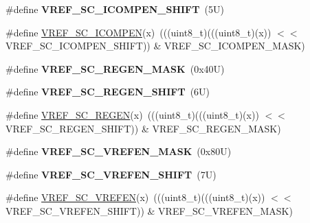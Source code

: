 \begin{DoxyCompactItemize}
\item 
\mbox{\label{group___v_r_e_f___register___masks_gab4b6bb1062b8e67c9224814d85df2a2c}} 
\#define {\bfseries V\+R\+E\+F\+\_\+\+S\+C\+\_\+\+I\+C\+O\+M\+P\+E\+N\+\_\+\+S\+H\+I\+FT}~(5\+U)
\item 
\#define \mbox{\hyperlink{group___v_r_e_f___register___masks_gab383d7f445ab9bf9266da50107d30f7f}{V\+R\+E\+F\+\_\+\+S\+C\+\_\+\+I\+C\+O\+M\+P\+EN}}(x)~(((uint8\+\_\+t)(((uint8\+\_\+t)(x)) $<$$<$ V\+R\+E\+F\+\_\+\+S\+C\+\_\+\+I\+C\+O\+M\+P\+E\+N\+\_\+\+S\+H\+I\+FT)) \& V\+R\+E\+F\+\_\+\+S\+C\+\_\+\+I\+C\+O\+M\+P\+E\+N\+\_\+\+M\+A\+SK)
\item 
\mbox{\label{group___v_r_e_f___register___masks_ga1396c56eb73d89394a57b1f83f20c9ea}} 
\#define {\bfseries V\+R\+E\+F\+\_\+\+S\+C\+\_\+\+R\+E\+G\+E\+N\+\_\+\+M\+A\+SK}~(0x40\+U)
\item 
\mbox{\label{group___v_r_e_f___register___masks_gacfe64ba6f4a76a4aef274f2fedb95a90}} 
\#define {\bfseries V\+R\+E\+F\+\_\+\+S\+C\+\_\+\+R\+E\+G\+E\+N\+\_\+\+S\+H\+I\+FT}~(6\+U)
\item 
\#define \mbox{\hyperlink{group___v_r_e_f___register___masks_gac93682ccff6c6c12d1929940d197020a}{V\+R\+E\+F\+\_\+\+S\+C\+\_\+\+R\+E\+G\+EN}}(x)~(((uint8\+\_\+t)(((uint8\+\_\+t)(x)) $<$$<$ V\+R\+E\+F\+\_\+\+S\+C\+\_\+\+R\+E\+G\+E\+N\+\_\+\+S\+H\+I\+FT)) \& V\+R\+E\+F\+\_\+\+S\+C\+\_\+\+R\+E\+G\+E\+N\+\_\+\+M\+A\+SK)
\item 
\mbox{\label{group___v_r_e_f___register___masks_ga2df8186aa60a77e25e67589bc50ce539}} 
\#define {\bfseries V\+R\+E\+F\+\_\+\+S\+C\+\_\+\+V\+R\+E\+F\+E\+N\+\_\+\+M\+A\+SK}~(0x80\+U)
\item 
\mbox{\label{group___v_r_e_f___register___masks_gaca5e397ea8b43f55854f4a6b80ec479b}} 
\#define {\bfseries V\+R\+E\+F\+\_\+\+S\+C\+\_\+\+V\+R\+E\+F\+E\+N\+\_\+\+S\+H\+I\+FT}~(7\+U)
\item 
\#define \mbox{\hyperlink{group___v_r_e_f___register___masks_ga7a5994dbf9e379f63aea014ab33e4822}{V\+R\+E\+F\+\_\+\+S\+C\+\_\+\+V\+R\+E\+F\+EN}}(x)~(((uint8\+\_\+t)(((uint8\+\_\+t)(x)) $<$$<$ V\+R\+E\+F\+\_\+\+S\+C\+\_\+\+V\+R\+E\+F\+E\+N\+\_\+\+S\+H\+I\+FT)) \& V\+R\+E\+F\+\_\+\+S\+C\+\_\+\+V\+R\+E\+F\+E\+N\+\_\+\+M\+A\+SK)
\end{DoxyCompactItemize}


